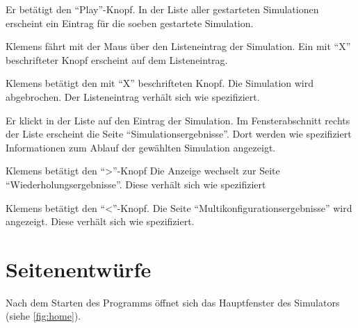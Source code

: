 \documentclass[parskip=full,11pt]{scrartcl}
\begin{document}
{Er betätigt den \enquote{Play}-Knopf.}
{In der Liste aller gestarteten Simulationen erscheint ein Eintrag für die soeben gestartete Simulation.}

{Klemens fährt mit der Maus über den Listeneintrag der Simulation.}
{Ein mit \enquote{X} beschrifteter Knopf erscheint auf dem Listeneintrag.}

{Klemens betätigt den mit \enquote{X} beschrifteten Knopf.}
{Die Simulation wird abgebrochen. Der Listeneintrag verhält sich wie spezifiziert.}

{Er klickt in der Liste auf den Eintrag der Simulation.}
{Im Fensterabschnitt rechts der Liste erscheint die Seite \enquote{Simulationsergebnisse}. Dort werden wie spezifiziert Informationen zum Ablauf der gewählten Simulation angezeigt.}

{Klemens betätigt den \enquote{>}-Knopf}
{Die Anzeige wechselt zur Seite \enquote{Wiederholungsergebnisse}. Diese verhält sich wie spezifiziert}

{Klemens betätigt den \enquote{<}-Knopf.}
{Die Seite \enquote{Multikonfigurationsergebnisse} wird angezeigt. Diese verhält sich wie spezifiziert.}


\appendix
\newpage
\section{Seitenentwürfe}

Nach dem Starten des Programms öffnet sich das Hauptfenster des Simulators \\(siehe \cref{fig:home}).
\end{document}
